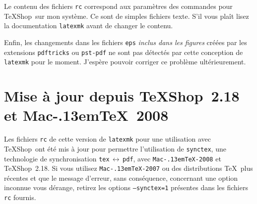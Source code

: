 \documentclass[11pt,french]{article}
\newcommand{\MacTeX}{Mac\kern-.13em\TeX}
\newcommand{\TS}{\textsf{\TeX Shop}}
\newcommand{\Toto}{\,\(\leftrightarrow\)\,}
\begin{document}
Le contenu des fichiers \texttt{rc} correspond aux paramètres des commandes pour \TS\ sur mon système. Ce sont de simples fichiers texte. S'il vous plaît lisez la documentation \texttt{latexmk} avant de changer le contenu.

Enfin, les changements dans les fichiers \texttt{eps} \emph{inclus dans les figures} créées par les extensions \texttt{pdftricks} ou \texttt{pst-pdf} ne sont pas détectés par cette conception de \texttt{latexmk} pour le moment. J'espère pouvoir corriger ce problème ultérieurement.

%

\section{Mise à jour depuis \TS\ 2.18 et \MacTeX\ 2008}

Les fichiers \texttt{rc} de cette version de \texttt{latexmk} pour une utilisation avec \TS\ ont été mis à jour pour permettre l'utilisation de \texttt{synctex}, une technologie de synchronisation \texttt{tex}\Toto\texttt{pdf}, avec \texttt{\MacTeX-2008} et \TS\ 2.18. Si vous utilisez \texttt{\MacTeX-2007} ou des distributions \TeX\ plus récentes et que le message d'erreur, sans conséquence, concernant une option inconnue vous dérange, retirez les options \texttt{--synctex=1} présentes dans les fichiers \texttt{rc} fournis.

%
\end{document}
